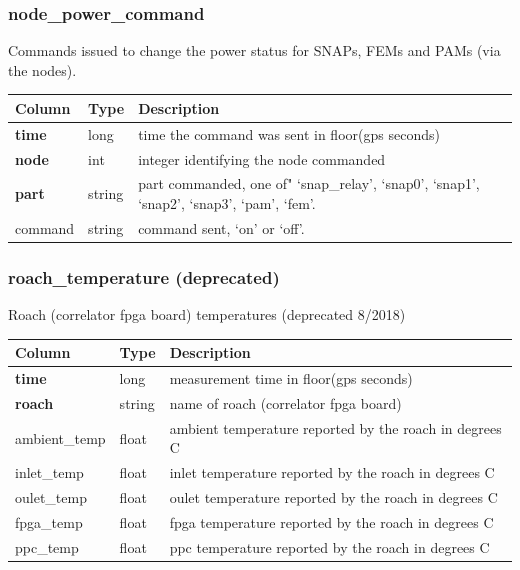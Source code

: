 \documentclass{article}
\begin{document}
{\subsubsection{node\_power\_command}
Commands issued to change the power status for SNAPs, FEMs and PAMs (via the nodes).
\begin{center}
 \begin{tabular}{| p{4cm} | p{2cm} | p{10cm} |}
\hline
 {\bf Column} & {\bf Type}  & {\bf Description} \\ [0.5ex]  \hline\hline
\textbf{time} & long & time the command was sent in floor(gps seconds)\\ \hline
\textbf{node} & int & integer identifying the node commanded \\ \hline
\textbf{part} & string & part commanded, one of" `snap\_relay', `snap0', `snap1', `snap2', `snap3', `pam', `fem'. \\ \hline
command & string & command sent, `on' or `off'. \\\hline
\end{tabular}
\end{center}


\subsubsection{roach\_temperature (deprecated)}
Roach (correlator fpga board) temperatures (deprecated 8/2018)
\begin{center}
 \begin{tabular}{| p{4cm} | p{2cm} | p{10cm} |}
\hline
 {\bf Column} & {\bf Type}  & {\bf Description} \\ [0.5ex]  \hline\hline
\textbf{time} & long & measurement time in floor(gps seconds)\\ \hline
\textbf{roach} & string & name of roach (correlator fpga board) \\ \hline
ambient\_temp & float & ambient temperature reported by the roach in degrees C \\\hline
inlet\_temp & float & inlet temperature reported by the roach in degrees C \\\hline
oulet\_temp & float & oulet temperature reported by the roach in degrees C \\\hline
fpga\_temp & float & fpga temperature reported by the roach in degrees C \\\hline
ppc\_temp & float & ppc temperature reported by the roach in degrees C \\\hline
\end{tabular}
\end{center}


}
\end{document}
